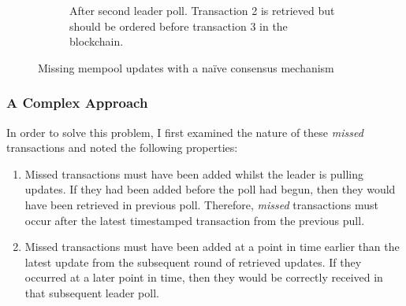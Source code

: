 \documentclass[12pt,a4paper,twoside,openright]{report}
\begin{document}
\begin{figure}
\begin{subfigure}[t]{0.40\textwidth}
			\caption{After second leader poll. Transaction 2 is retrieved but should be ordered before transaction 3 in the blockchain.}
		\end{subfigure}
		\caption{Missing mempool updates with a na\"{i}ve consensus mechanism}	
		\label{fig:readremotepartudpatesbroke}
	\end{figure}
	\subsubsection*{A Complex Approach}
	In order to solve this problem, I first examined the nature of these \textit{missed} transactions and noted the following properties:
	\begin{enumerate}
		\item Missed transactions must have been added whilst the leader is pulling updates. 
		If they had been added before the poll had begun, then they would have been retrieved in previous poll. 
		Therefore, \textit{missed} transactions must occur after the latest timestamped transaction from the previous pull. 
		\item Missed transactions must have been added at a point in time earlier than the latest update from the subsequent round of retrieved updates.
		If they occurred at a later point in time, then they would be correctly received in that subsequent leader poll.
	\end{enumerate}
\end{document}
